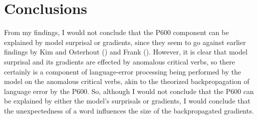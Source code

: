 \documentclass{IEEEtran}
\begin{document}
\section{Conclusions}
From my findings, I would not conclude that the P600 component can be explained by model surprisal or gradients, since they seem to go against earlier findings by Kim and Osterhout (\cite{kim2005combinatory}) and Frank (\cite{frank2024gradients}).
However, it is clear that model surprisal and its gradients are effected by anomalous critical verbs, so there certainly is a component of language-error processing being performed by the model on the anomalous critical verbs, akin to the theorized backpropagation of language error by the P600.
So, although I would not conclude that the P600 can be explained by either the model's surprisals or gradients, I would conclude that the unexpectedness of a word influences the size of the backpropagated gradients.


\end{document}
